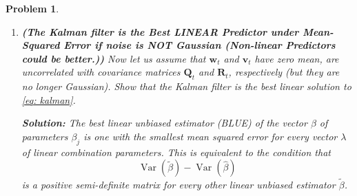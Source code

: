 \documentclass[11pt]{article}
\theoremstyle{plain} %
\newtheorem{problem}[theorem]{Problem}
\newenvironment{solution}
{\color{C2}\normalfont\begin{framed}\begingroup\textbf{Solution:} }
  {\endgroup\end{framed}}
\theoremstyle{remark}
\newcommand{\EE}{\mathbb{E}}
\begin{document}
\begin{problem}
\begin{enumerate}[label=(\alph*)]
\begin{solution}
\begin{align*}
            + 2\mathbb{E}\left\{\mathbb{E}\left[\phi(\hat{\mathbf{x}}_t)\left(\EE\left[\mathbf{x}_t\mid \mathbf{Y}_t\right] - \EE\left[\mathbf{x}_t\mid \mathbf{Y}_t\right]\right)\right]\right\}                                      \\
             & =  \mathbb{E}\left[\|\mathbf{L}_t^\top \left(\mathbf{x}_t - \EE\left[\mathbf{x}_t\mid \mathbf{Y}_t\right]\right)\|^2\right]
            + \mathbb{E}\left[\|\mathbf{L}_t^\top\left(\EE\left[\mathbf{x}_t\mid \mathbf{Y}_t\right] - \hat{\mathbf{x}}_t\right)\|^2\right]                                                                                            \\
             & \ge  \mathbb{E}\left[\|\mathbf{L}_t^\top \left(\mathbf{x}_t - \EE\left[\mathbf{x}_t\mid \mathbf{Y}_t\right]\right)\|^2\right]
          \end{align*}
          where the equality can be attained when $\hat{\mathbf{x}}_t = \EE\left[\mathbf{x}_t\mid \mathbf{Y}_t\right]$.

          Therefore, the Kalman filter is the solution to the problem $\min_{\hat{\mathbf{x}}_t} \mathbb{E}\left[\widetilde{\mathbf{x}}_t^\top \mathbf{W}_t \widetilde{\mathbf{x}}_t\right]$.
        \end{solution}
        \item \textbf{(The Kalman filter is the Best LINEAR Predictor under Mean-Squared Error if noise is NOT Gaussian (Non-linear Predictors could be better.))} Now
        let us assume that $\mathbf{w}_t$ and $\mathbf{v}_t$ have zero mean, are
        uncorrelated with covariance matrices $\mathbf{Q}_t$ and $\mathbf{R}_t$,
        respectively (but they are no longer Gaussian). Show that the Kalman filter is
        the best linear solution to \cref{eq: kalman}.

        \begin{solution}
          The best linear unbiased estimator (BLUE) of the vector $\beta$ of
          parameters $\beta_j$ is one with the smallest mean squared error for
          every vector $\lambda$ of linear combination parameters. This is
          equivalent to the condition that
          $$
            \operatorname{Var}(\tilde{\beta})-\operatorname{Var}(\widehat{\beta})
          $$
          is a positive semi-definite matrix for every other linear unbiased estimator
          $\tilde{\beta}$.


\end{solution}
\end{enumerate}
\end{problem}
\end{document}
